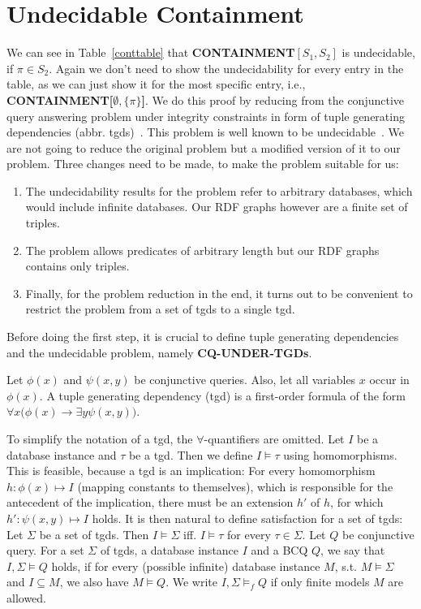 \section{Undecidable Containment}
We can see in Table~\ref{conttable} that
\textbf{CONTAINMENT$[S_1,S_2]$} is undecidable, if $\pi \in S_2$. Again we don't need to show
the undecidability for every entry in the table, as we can just show it for the
most specific entry, i.e.,
\textbf{CONTAINMENT[$\emptyset,\{\pi\}$]}. We do this proof by
reducing from the conjunctive query answering problem under integrity 
constraints in form of tuple generating dependencies (abbr. tgds)~\cite{JOHNSON1984167,cali2008taming}. This problem
is well known to be undecidable~\cite{JOHNSON1984167,cali2008taming}. We are not going to reduce the original problem but a modified version of it to our problem. 
Three changes need to be made, to make the problem suitable for us:
\begin{enumerate}
	\item  The undecidability results for the problem refer to arbitrary
		databases, which would include infinite databases. Our RDF graphs
		however are a finite set of triples.
	\item The problem allows predicates of arbitrary length but our RDF graphs
		contains only triples. 
	\item Finally, for the problem reduction in the end, it turns out to be
		convenient to restrict the problem from a set of tgds to a single tgd.
\end{enumerate}

Before doing the first step, it is crucial to define tuple generating dependencies 
and the undecidable problem, namely \textbf{CQ-UNDER-TGDs}.

\begin{definition}
	Let $\phi(x)$ and $\psi(x,y)$ be conjunctive queries.
	Also, let all variables $x$ occur in $\phi(x)$.
	A tuple generating dependency (tgd) is a first-order formula of the form 
	$\forall x \big(\phi(x) \rightarrow \exists y\psi(x,y)\big)$.
\end{definition}
To simplify the notation of a tgd, the $\forall$-quantifiers are omitted.
Let $I$ be a database instance and $\tau$ be a tgd. Then we define $I \models
\tau$ using homomorphisms. This is feasible, because a tgd is an implication:
For every homomorphism $h: \phi(x) \mapsto I$ (mapping constants to
themselves), which is responsible for the antecedent of the implication, there
must be an extension $h'$ of $h$, for which $h':\psi(x,y) \mapsto I$
holds. It is then natural to define satisfaction for a set of tgds: Let $\Sigma$
be a set of tgds. Then $I \models \Sigma$ iff. $I \models \tau$ for every $\tau
\in \Sigma$.
Let $Q$ be conjunctive query. For a set $\Sigma$ of tgds, a database instance
$I$ and a BCQ $Q$, we say that $I,\Sigma \models Q$ holds, if for every
(possible infinite) database instance $M$, s.t. $M \models \Sigma$ and $I
\subseteq M$, we also have $M \models Q$. We write $I, \Sigma \models_f Q$ if
only finite models $M$ are allowed.

